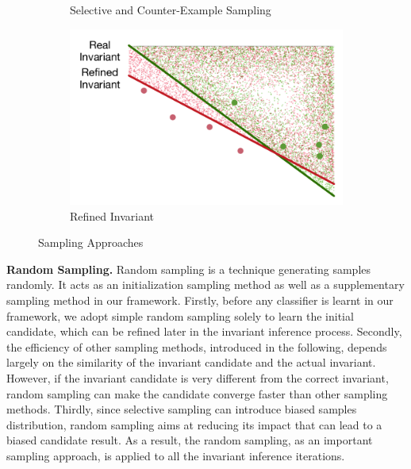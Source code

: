 \begin{figure}[!h]
\begin{subfigure}{0.23\textwidth}
        \caption{Selective and Counter-Example Sampling}
        \label{fig:sampling:selective}
    \end{subfigure}
    \begin{subfigure}{0.23\textwidth}
        \centering
        \includegraphics[scale=0.3]{figures/general-sampling-3.pdf}
        \caption{Refined Invariant}
        \label{fig:sampling:selective:invariant}
    \end{subfigure}
    \caption{Sampling Approaches}
    \label{fig:sampling}
\end{figure}

\medskip\noindent
\textbf{Random Sampling.}
Random sampling is a technique generating samples randomly.
It acts as an initialization sampling method 
as well as a supplementary sampling method in our framework. 
Firstly, before any classifier is learnt in our framework, 
we adopt simple random sampling solely to learn the initial candidate, 
which can be refined later in the invariant inference process. 
Secondly, the efficiency of other sampling methods, introduced in the following, 
depends largely on the similarity of the invariant candidate and the actual invariant. 
However, if the invariant candidate is very different from the correct invariant, 
random sampling can make the candidate converge faster than other sampling methods. 
Thirdly, since selective sampling can introduce biased samples distribution, 
random sampling aims at reducing its impact that can lead to a biased candidate result. 
As a result, the random sampling, as an important sampling approach, 
is applied to all the invariant inference iterations. 

